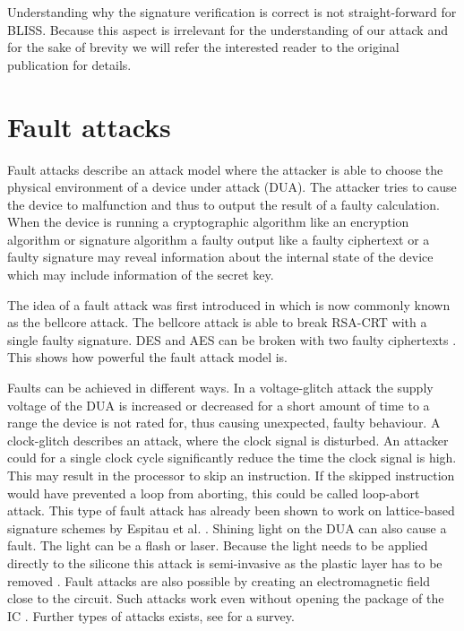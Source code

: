  Understanding why the signature verification is correct is not straight-forward for BLISS. Because this aspect is irrelevant for the understanding of our attack and for the sake of brevity we will refer the interested reader to the original publication  \cite{bliss_full} for details.  





\section{Fault attacks}
Fault attacks describe an attack model where the attacker is able to choose the physical environment of a device under attack (DUA). The attacker tries to cause the device to malfunction and thus to output the result of a faulty calculation. When the device is running a cryptographic algorithm like an encryption algorithm or signature algorithm a faulty output like a faulty ciphertext or a faulty signature may reveal information about the internal state of the device which may include information of the secret key.

The idea of a fault attack was first introduced in \cite{bellcore} which is now commonly known as the bellcore attack. The bellcore attack is able to break RSA-CRT with a single faulty signature. DES and AES can be broken with two faulty ciphertexts \cite[p.~544]{fault_survey}. This shows how powerful the fault attack model is.

Faults can be achieved in different ways. In a voltage-glitch attack the supply voltage of the DUA is increased or decreased for a short amount of time to a range the device is not rated for, thus causing unexpected, faulty behaviour.
A clock-glitch describes an attack, where the clock signal is disturbed. An attacker could for a single clock cycle significantly reduce the time the clock signal is high. This may result in the processor to skip an instruction. If the skipped instruction would have prevented a loop from aborting, this could be called loop-abort attack. This type of fault attack has already been shown to work on lattice-based signature schemes by Espitau et al. \cite[pp.~1545--1546]{espitau_kem}.
Shining light on the DUA can also cause a fault. The light can be a flash or laser. Because the light needs to be applied directly to the silicone this attack is semi-invasive as the plastic layer has to be removed \cite[pp.~161--162]{older_fault_survey}.
Fault attacks are also possible by creating an electromagnetic field close to the circuit. Such attacks work even without opening the package of the IC \cite{fault_magnetic}. 
Further types of attacks exists, see \cite{fault_survey} for a survey.


